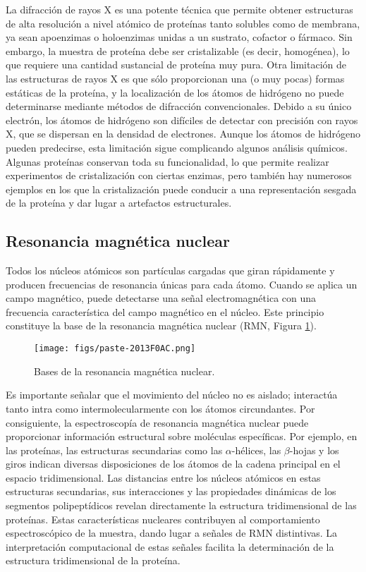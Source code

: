 La difracción de rayos X es una potente técnica que permite obtener estructuras de alta resolución a nivel atómico de proteínas tanto solubles como de membrana, ya sean apoenzimas o holoenzimas unidas a un sustrato, cofactor o fármaco. Sin embargo, la muestra de proteína debe ser cristalizable (es decir, homogénea), lo que requiere una cantidad sustancial de proteína muy pura. Otra limitación de las estructuras de rayos X es que sólo proporcionan una (o muy pocas) formas estáticas de la proteína, y la localización de los átomos de hidrógeno no puede determinarse mediante métodos de difracción convencionales. Debido a su único electrón, los átomos de hidrógeno son difíciles de detectar con precisión con rayos X, que se dispersan en la densidad de electrones. Aunque los átomos de hidrógeno pueden predecirse, esta limitación sigue complicando algunos análisis químicos. Algunas proteínas conservan toda su funcionalidad, lo que permite realizar experimentos de cristalización con ciertas enzimas, pero también hay numerosos ejemplos en los que la cristalización puede conducir a una representación sesgada de la proteína y dar lugar a artefactos estructurales.

\subsection{Resonancia magnética nuclear}
Todos los núcleos atómicos son partículas cargadas que giran rápidamente y producen frecuencias de resonancia únicas para cada átomo. Cuando se aplica un campo magnético, puede detectarse una señal electromagnética con una frecuencia característica del campo magnético en el núcleo. Este principio constituye la base de la resonancia magnética nuclear (RMN, Figura \ref{fig/rmn}).

\begin{figure}[h]
\centering
\texttt{[image: figs/paste-2013F0AC.png]}
\caption{Bases de la resonancia magnética nuclear.}
\label{fig/rmn}
\end{figure}

Es importante señalar que el movimiento del núcleo no es aislado; interactúa tanto intra como intermolecularmente con los átomos circundantes. Por consiguiente, la espectroscopía de resonancia magnética nuclear puede proporcionar información estructural sobre moléculas específicas. Por ejemplo, en las proteínas, las estructuras secundarias como las $\alpha$-hélices, las $\beta$-hojas y los giros indican diversas disposiciones de los átomos de la cadena principal en el espacio tridimensional. Las distancias entre los núcleos atómicos en estas estructuras secundarias, sus interacciones y las propiedades dinámicas de los segmentos polipeptídicos revelan directamente la estructura tridimensional de las proteínas. Estas características nucleares contribuyen al comportamiento espectroscópico de la muestra, dando lugar a señales de RMN distintivas. La interpretación computacional de estas señales facilita la determinación de la estructura tridimensional de la proteína.

